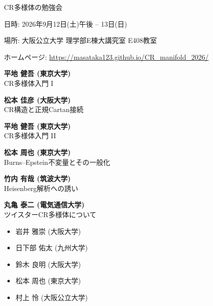 \documentclass[dvipdfmx,a4paper,12pt]{article}
\theoremstyle{plain} %
\theoremstyle{definition} %
\begin{document}
\begin{center}
  {\LARGE CR多様体の勉強会}
 
  \end{center}
  
\vskip5mm
\begin{flushleft}
{ 日時: 2026年9月12日(土)午後 -- 13日(日)}


{ 場所: 大阪公立大学 理学部E棟大講究室 E408教室}

ホームページ: \url{https://masataka123.github.io/CR_manifold_2026/}

\end{flushleft}




\vskip5mm
\vskip3mm


\vskip1mm
{\bf 平地 健吾 (東京大学)}\\
CR多様体入門 I
\vskip3mm

{\bf 松本 佳彦 (大阪大学)}\\
CR構造と正規Cartan接続
\vskip5mm

\vskip1mm
{\bf 平地 健吾 (東京大学)}\\
CR多様体入門 II
\vskip3mm

{\bf 松本 周也 (東京大学)}\\
Burns--Epstein不変量とその一般化
\vskip3mm

{\bf 竹内 有哉 (筑波大学)}\\
Heisenberg解析への誘い
\vskip3mm

{\bf 丸亀 泰二 (電気通信大学)}\\
ツイスターCR多様体について 
\vskip5mm

  
  
  \vskip5mm
\begin{itemize}
  \setlength{\parskip}{0cm} 
  \setlength{\itemsep}{0cm}
\item 岩井 雅崇 (大阪大学)
\item 日下部 佑太 (九州大学)
\item 鈴木 良明 (大阪大学)
\item 松本 周也 (東京大学)
\item 村上 怜 (大阪公立大学)
  \end{itemize}
\end{document}
